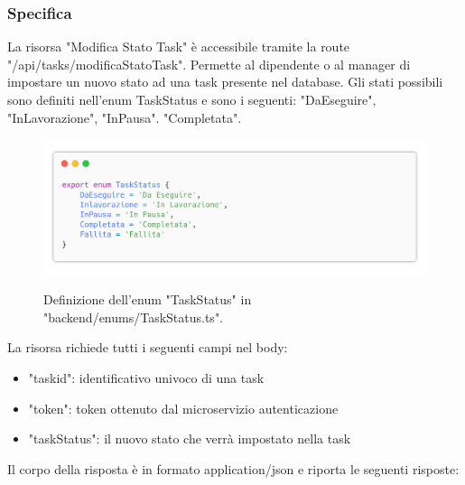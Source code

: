 \documentclass{report}
\begin{document}
\subsubsection*{Specifica}

La risorsa "Modifica Stato Task" è accessibile tramite la route "/api/tasks/modificaStatoTask". Permette al dipendente o al manager di impostare un nuovo stato ad una task presente nel database. Gli stati possibili sono definiti nell'enum TaskStatus e sono i seguenti: "DaEseguire", "InLavorazione", "InPausa". "Completata".

\begin{figure}[H]
	\centering\includegraphics[width=1\textwidth]{images/code_enum_taskStatus.png}
	
	Definizione dell'enum "TaskStatus" in "backend/enums/TaskStatus.ts".
\end{figure}

La risorsa richiede tutti i seguenti campi nel body:
\begin{itemize}
	\item "taskid": identificativo univoco di una task
	\item "token": token ottenuto dal microservizio autenticazione
	\item "taskStatus": il nuovo stato che verrà impostato nella task
\end{itemize}

Il corpo della risposta è in formato application/json e riporta le seguenti risposte:
\end{document}

